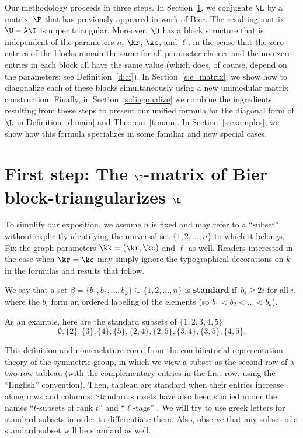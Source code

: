 Our methodology proceeds in three steps.  In Section~\ref{s:p_matrix}, we conjugate $\L$ by a matrix~$\P$ that has previously appeared in work of Bier.  The resulting matrix $\U - \lambda \I$ is upper triangular.  Moreover, $\U$ has a block structure that is independent of the parameters $n$, $\kr$, $\kc$, and $\ell$, in the sense that the zero entries of the blocks remain the same for all parameter choices and the non-zero entries in each block all have the same value (which does, of course, depend on the parameters; see Definition~\ref{d:cf}).  In Section~\ref{s:e_matrix}, we show how to diagonalize each of these blocks simultaneously using a new unimodular matrix construction.  Finally, in Section~\ref{s:diagonalize} we combine the ingredients resulting from these steps to present our unified formula for the diagonal form of $\L$ in Definition~\ref{d:main} and Theorem~\ref{t:main}.  In Section~\ref{s:examples}, we show how this formula specializes in some familiar and new special cases.



\section{First step:  The \texorpdfstring{$\P$}{P}-matrix of Bier block-triangularizes \texorpdfstring{$\L$}{L}}\label{s:p_matrix}

To simplify our exposition, we assume $n$ is fixed and may refer to a ``subset'' without explicitly identifying the universal set $\{1, 2, \ldots, n\}$ to which it belongs.  Fix the graph parameters $\kk = (\kr, \kc)$ and $\ell$ as well.  Readers interested in the case when $\kr = \kc$ may simply ignore the typographical decorations on $k$ in the formulas and results that follow.

\begin{definition}\label{d:standard}
We say that a set $\beta = \{b_1, b_2, \ldots, b_k\} \subseteq \{1, 2, \ldots, n\}$ is {\bf standard} if~$b_i \geq 2i$ for all $i$, where the $b_i$ form an ordered labeling of the elements (so $b_1 < b_2 < \ldots < b_k$).
\end{definition}

As an example, here are the standard subsets of $\{1, 2, 3, 4, 5\}$:
\[
\emptyset, \{2\}, \{3\}, \{4\}, \{5\}, \{2,4\}, \{2,5\}, \{3,4\}, \{3,5\}, \{4,5\}.
\]


This definition and nomenclature come from the combinatorial representation theory of the symmetric group, in which we view a subset as the second row of a two-row tableau (with the complementary entries in the first row, using the ``English'' convention).  Then, tableau are standard when their entries increase along rows and columns.  Standard subsets have also been studied under the names ``$t$-subsets of rank $t$'' \cite{frankl,bier} and ``$\ell$-tags'' \cite{singhi}.  We will try to use greek letters for standard subsets in order to differentiate them.  Also, observe that any subset of a standard subset will be standard as well.

